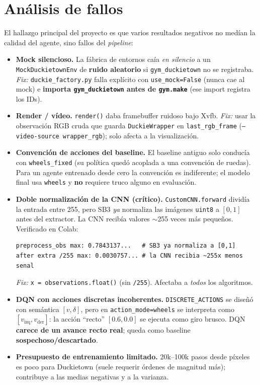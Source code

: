 \documentclass[11pt,a4paper]{article}
\newcommand{\code}[1]{\texttt{#1}}
\begin{document}
\section{Análisis de fallos}
\label{sec:fallos}
El hallazgo principal del proyecto es que varios resultados negativos no medían la calidad
del agente, sino fallos del \emph{pipeline}:
\begin{itemize}
  \item \textbf{Mock silencioso.} La fábrica de entornos caía \emph{en silencio} a un
  \code{MockDuckietownEnv} de \textbf{ruido aleatorio} si \code{gym\_duckietown} no se
  registraba. \emph{Fix:} \code{duckie\_factory.py} falla explícito con \code{use\_mock=False}
  (nunca cae al mock) e \textbf{importa \code{gym\_duckietown} antes de \code{gym.make}} (ese
  import registra los IDs).
  \item \textbf{Render / vídeo.} \code{render()} daba framebuffer ruidoso bajo Xvfb. \emph{Fix:}
  usar la observación RGB cruda que guarda \code{DuckieWrapper} en \code{last\_rgb\_frame}
  (\code{--video-source wrapper\_rgb}); solo afecta a la visualización.
  \item \textbf{Convención de acciones del baseline.} El baseline antiguo solo conducía con
  \code{wheels\_fixed} (su política quedó acoplada a una convención de ruedas). Para un agente
  entrenado desde cero la convención es indiferente; el modelo final usa \code{wheels} y
  \textbf{no} requiere truco alguno en evaluación.
  \item \textbf{Doble normalización de la CNN (crítico).} \code{CustomCNN.forward} dividía la
  entrada entre 255, pero SB3 \emph{ya} normaliza las imágenes \code{uint8} a $[0,1]$ antes
  del extractor. La CNN recibía valores $\sim$255 veces más pequeños. Verificado en Colab:
  \begin{verbatim}
preprocess_obs max: 0.7843137...   # SB3 ya normaliza a [0,1]
after extra /255 max: 0.0030757... # la CNN recibia ~255x menos senal
  \end{verbatim}
  \emph{Fix:} \code{x = observations.float()} (sin \code{/255}). Afectaba a \emph{todos} los
  algoritmos.
  \item \textbf{DQN con acciones discretas incoherentes.} \code{DISCRETE\_ACTIONS} se diseñó
  con semántica $[v,\delta]$, pero en \code{action\_mode=wheels} se interpreta como
  $[v_{\text{izq}},v_{\text{der}}]$: la acción ``recto'' $[0.6,0.0]$ se ejecuta como giro
  brusco. DQN \textbf{carece de un avance recto real}; queda como baseline
  \textbf{sospechoso/descartado}.
  \item \textbf{Presupuesto de entrenamiento limitado.} 20k--100k pasos desde píxeles es
  poco para Duckietown (suele requerir órdenes de magnitud más); contribuye a las medias
  negativas y a la varianza.
\end{itemize}
\end{document}
